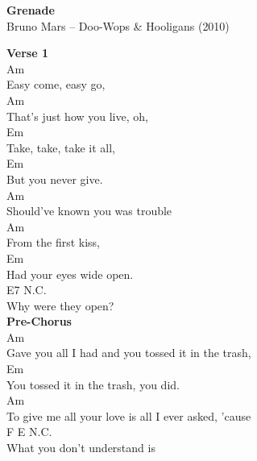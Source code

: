 \documentclass[a4paper]{article}
\begin{document}
    \begin{center}
        \textbf{Grenade}
        ~\\
        Bruno Mars -- Doo-Wops \& Hooligans (2010)
    \end{center}
    {
        \scriptsize
        \textbf{Verse 1}
        ~\\
        {
            \cutive
            \obeyspaces
Am
\\
Easy come, easy go,
\\
Am
\\
That's just how you live, oh,
\\
Em
\\
Take, take, take it all,
\\
Em
\\
But you never give.
\\
Am
\\
Should've known you was trouble
\\
Am
\\
From the first kiss,
\\
         Em
\\
Had your eyes wide open.
\\
E7 N.C.
\\
  Why were they open?
\\

        }
        \textbf{Pre-Chorus}
        ~\\
        {
            \cutive
            \obeyspaces
Am
\\
Gave you all I had and you tossed it in the trash,
\\
     Em
\\
You tossed it in the trash, you did.
\\
    Am
\\
To give me all your love is all I ever asked, 'cause
\\
F                    E N.C.
\\
  What you don't understand is
\\

}}
\end{document}
